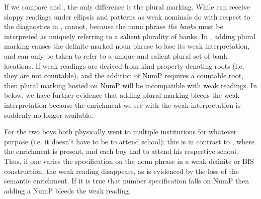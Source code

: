 \documentclass[output=paper,
modfonts
]{langscibook}
\begin{document}
\begin{exe}
\end{exe}

If we compare  and , the only difference is the plural marking. While  can receive sloppy readings under ellipsis and patterns as weak nominals do with respect to the diagnostics in ,  cannot, because the noun phrase \textit{the banks} must be interpreted as uniquely referring to a salient plurality of banks. In , adding plural marking causes the definite-marked noun phrase to lose its weak interpretation, and can only be taken to refer to a unique and salient plural set of bank locations. If weak readings are derived from kind property-denoting roots (i.e. they are not countable), and the addition of NumP requires a countable root, then plural marking hosted on NumP will be incompatible with weak readings. In  below, we have further evidence that adding plural marking bleeds the weak interpretation because the enrichment we see with the weak interpretation is suddenly no longer available. 

\begin{exe}
\end{exe}

For  the two boys both physically went to multiple institutions for whatever purpose (i.e. it doesn't have to be to attend school); this is in contrast to , where the enrichment is present, and each boy had to attend his respective school. Thus, if one varies the  specification on the noun phrase in a weak definite or BIS construction, the weak reading disappears, as is evidenced by the loss of the semantic enrichment. If it is true that number specification falls on NumP then adding a NumP bleeds the weak reading. 
\end{document}

